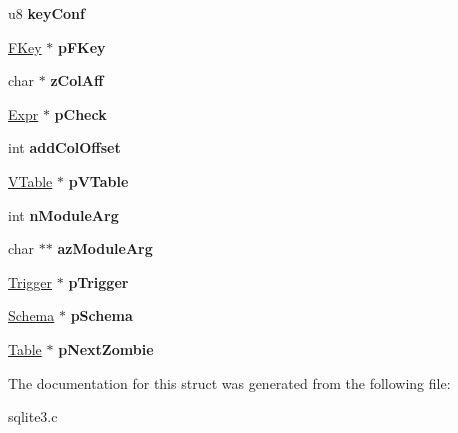\begin{DoxyCompactItemize}
\item 
\hypertarget{struct_table_add1b22425db781d976d25b4465a2965a}{u8 {\bfseries key\-Conf}}\label{struct_table_add1b22425db781d976d25b4465a2965a}

\item 
\hypertarget{struct_table_a37ccce5ee6d530001d49c82788c6616d}{\hyperlink{struct_f_key}{F\-Key} $\ast$ {\bfseries p\-F\-Key}}\label{struct_table_a37ccce5ee6d530001d49c82788c6616d}

\item 
\hypertarget{struct_table_ac95c0c7b04f2c8367beb98d386d4228f}{char $\ast$ {\bfseries z\-Col\-Aff}}\label{struct_table_ac95c0c7b04f2c8367beb98d386d4228f}

\item 
\hypertarget{struct_table_af1f659d88810fcd5813c2b415a4e0167}{\hyperlink{struct_expr}{Expr} $\ast$ {\bfseries p\-Check}}\label{struct_table_af1f659d88810fcd5813c2b415a4e0167}

\item 
\hypertarget{struct_table_ab6f1ad10bce5c20faca55cd0a9c3f1ff}{int {\bfseries add\-Col\-Offset}}\label{struct_table_ab6f1ad10bce5c20faca55cd0a9c3f1ff}

\item 
\hypertarget{struct_table_a7b9903cfbfefe7b8bf872c4f50cb2e95}{\hyperlink{struct_v_table}{V\-Table} $\ast$ {\bfseries p\-V\-Table}}\label{struct_table_a7b9903cfbfefe7b8bf872c4f50cb2e95}

\item 
\hypertarget{struct_table_a74a2c5547ea876ebe77dbea0d99361bf}{int {\bfseries n\-Module\-Arg}}\label{struct_table_a74a2c5547ea876ebe77dbea0d99361bf}

\item 
\hypertarget{struct_table_af3af6596efa41894bcd3c3c9f9b6781f}{char $\ast$$\ast$ {\bfseries az\-Module\-Arg}}\label{struct_table_af3af6596efa41894bcd3c3c9f9b6781f}

\item 
\hypertarget{struct_table_aca61c40bb0164f2c6fc3406c28988660}{\hyperlink{struct_trigger}{Trigger} $\ast$ {\bfseries p\-Trigger}}\label{struct_table_aca61c40bb0164f2c6fc3406c28988660}

\item 
\hypertarget{struct_table_a1d6ce038a061722cebaeba0f3ffceacf}{\hyperlink{struct_schema}{Schema} $\ast$ {\bfseries p\-Schema}}\label{struct_table_a1d6ce038a061722cebaeba0f3ffceacf}

\item 
\hypertarget{struct_table_ae365eb0d8f6d3cb39f3908323cba45e4}{\hyperlink{struct_table}{Table} $\ast$ {\bfseries p\-Next\-Zombie}}\label{struct_table_ae365eb0d8f6d3cb39f3908323cba45e4}

\end{DoxyCompactItemize}


The documentation for this struct was generated from the following file\-:\begin{DoxyCompactItemize}
\item 
sqlite3.\-c\end{DoxyCompactItemize}
